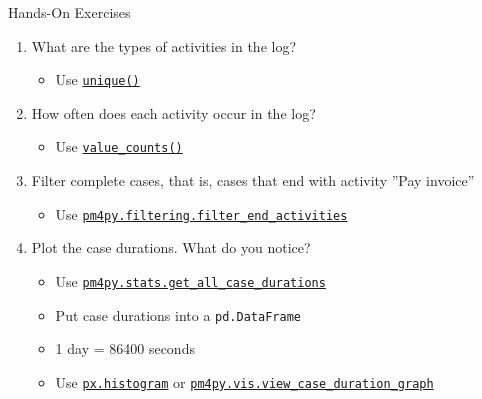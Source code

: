 \documentclass[ignorenonframetext,xcolor=x11names]{beamer}
\begin{document}
\begin{frame}{Hands-On Exercises}
\begin{enumerate}
    \item What are the types of activities in the log?
    \begin{itemize}
       \item Use \href{https://pandas.pydata.org/docs/reference/api/pandas.unique.html}{\texttt{unique()}}
    \end{itemize}
    \item How often does each activity occur in the log?
    \begin{itemize}
       \item Use \href{https://pandas.pydata.org/pandas-docs/stable/reference/api/pandas.Series.value_counts.html}{\texttt{value\_counts()}}
    \end{itemize}
    \item Filter complete cases, that is, cases that end with activity ''Pay invoice''
    \begin{itemize}
       \item Use \href{https://processintelligence.solutions/static/api/2.7.11/generated/pm4py.filtering.filter_end_activities.html}{\texttt{pm4py.filtering.filter\_end\_activities}}
    \end{itemize}
    \item Plot the case durations. What do you notice?
    \begin{itemize}
       \item Use \href{https://processintelligence.solutions/static/api/2.7.11/generated/pm4py.stats.get_all_case_durations.html}{\texttt{pm4py.stats.get\_all\_case\_durations}}
       \item Put case durations into a \texttt{pd.DataFrame}
       \item 1 day = 86400 seconds
       \item Use \href{https://plotly.com/python/histograms/}{\texttt{px.histogram}} or \href{https://processintelligence.solutions/static/api/2.7.11/generated/pm4py.vis.view_case_duration_graph.html}{\texttt{pm4py.vis.view\_case\_duration\_graph}}
    \end{itemize}
\end{enumerate}
\end{frame}
\end{document}
